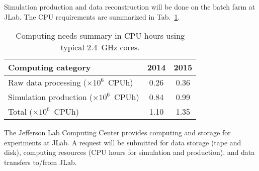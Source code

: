 Simulation production and data reconstruction will be done on the batch farm at JLab. The CPU requirements 
are summarized in Tab.~\ref{tab:computing}.
\begin{table}[ht]
\centering
\begin{tabular}{|l|c|c|}
\hline
Computing category & 2014& 2015 \\
\hline
Raw data processing ($\times 10^{6}$~CPUh)  & 0.26 & 0.36 \\
Simulation production ($\times 10^{6}$~CPUh) & 0.84 & 0.99 \\
\hline
Total ($\times 10^{6}$~CPUh) & 1.10 & 1.35 \\
\hline
\end{tabular}
\caption{{\small Computing needs summary in CPU hours using typical 2.4~GHz cores.}}
\label{tab:computing}
\end{table}

The Jefferson Lab Computing Center provides computing and storage for experiments at JLab. 
A request will be submitted for data storage (tape and disk), computing resources (CPU hours for simulation and production), and data transfers to/from JLab.
